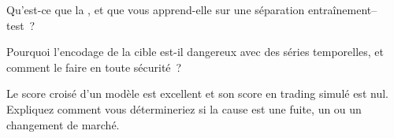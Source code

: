 \begin{interviewq}\label{iq:ml:validation:4}
Qu'est-ce que la , et que vous apprend-elle sur une séparation entraînement--test~?
\end{interviewq}

\begin{interviewq}\label{iq:ml:validation:5}
Pourquoi l'encodage de la cible est-il dangereux avec des séries temporelles, et comment le faire en toute sécurité~?
\end{interviewq}

\begin{interviewq}\label{iq:ml:validation:6}
Le score croisé d'un modèle est excellent et son score en trading simulé est nul. Expliquez comment vous détermineriez si la cause est une fuite,
un  ou un changement de marché.
\end{interviewq}
